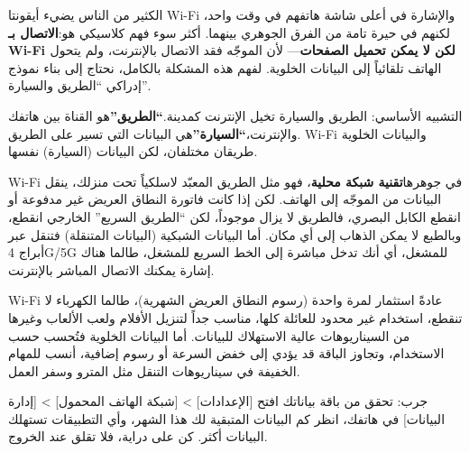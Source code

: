 


الكثير من الناس يضيء أيقونتا Wi-Fi والإشارة في أعلى شاشة هاتفهم في وقت واحد، لكنهم في حيرة تامة من الفرق الجوهري بينهما. أكثر سوء فهم كلاسيكي هو:\textbf{الاتصال بـ Wi-Fi لكن لا يمكن تحميل الصفحات}— لأن الموجّه فقد الاتصال بالإنترنت، ولم يتحول الهاتف تلقائياً إلى البيانات الخلوية. لفهم هذه المشكلة بالكامل، نحتاج إلى بناء نموذج إدراكي “الطريق والسيارة”.

\begin{tcbinfo}{التشبيه الأساسي: الطريق والسيارة}
تخيل الإنترنت كمدينة.\textbf{“الطريق”}هو القناة بين هاتفك والإنترنت،\textbf{“السيارة”}هي البيانات التي تسير على الطريق. Wi-Fi والبيانات الخلوية طريقان مختلفان، لكن البيانات (السيارة) نفسها.

\end{tcbinfo}


Wi-Fi في جوهرها\textbf{تقنية شبكة محلية}، فهو مثل الطريق المعبّد لاسلكياً تحت منزلك، ينقل البيانات من الموجّه إلى الهاتف. لكن إذا كانت فاتورة النطاق العريض غير مدفوعة أو انقطع الكابل البصري، فالطريق لا يزال موجوداً، لكن “الطريق السريع” الخارجي انقطع، وبالطبع لا يمكن الذهاب إلى أي مكان. أما البيانات الشبكية (البيانات المتنقلة) فتنقل عبر أبراج 4G/5G للمشغل، أي أنك تدخل مباشرة إلى الخط السريع للمشغل، طالما هناك إشارة يمكنك الاتصال المباشر بالإنترنت.


Wi-Fi عادةً استثمار لمرة واحدة (رسوم النطاق العريض الشهرية)، طالما الكهرباء لا تنقطع، استخدام غير محدود للعائلة كلها، مناسب جداً لتنزيل الأفلام ولعب الألعاب وغيرها من السيناريوهات عالية الاستهلاك للبيانات. أما البيانات الخلوية فتُحسب حسب الاستخدام، وتجاوز الباقة قد يؤدي إلى خفض السرعة أو رسوم إضافية، أنسب للمهام الخفيفة في سيناريوهات التنقل مثل المترو وسفر العمل.

\begin{tcbpractice}{جرب: تحقق من باقة بياناتك}
افتح [الإعدادات] > [شبكة الهاتف المحمول] > [إدارة البيانات] في هاتفك، انظر كم البيانات المتبقية لك هذا الشهر، وأي التطبيقات تستهلك البيانات أكثر. كن على دراية، فلا تقلق عند الخروج.

\end{tcbpractice}

